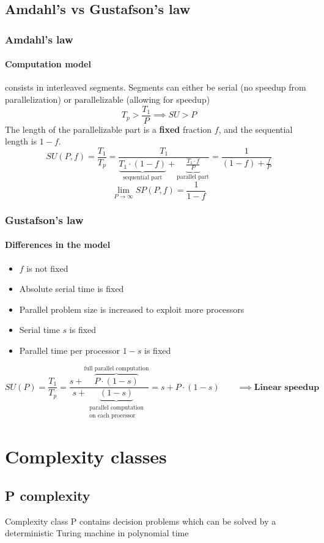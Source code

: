 \documentclass{article}
\begin{document}
\subsection{Amdahl's vs Gustafson's law}
\subsubsection{Amdahl's law}
\paragraph{Computation model} consists in interleaved segments. Segments can either be serial (no speedup from parallelization) or parallelizable (allowing for speedup)\\
\[T_p>\frac{T_1}{P} \implies SU>P\]
The length of the parallelizable part is a \textbf{fixed} fraction $f$, and the sequential length is $1-f$.
\[
SU(P,f)=\frac{T_1}{T_p}
=\frac{T_1}{\underbrace{T_1\cdot (1-f)}_\text{sequential part}+\underbrace{\frac{T_1\cdot f}{P}}_\text{parallel part}}
=\frac{1}{(1-f)+\frac{f}{P}}
\]
\[\lim_{P\to \infty} SP(P,f) = \frac{1}{1-f}
\]

\subsubsection{Gustafson's law}
\paragraph{Differences in the model}
\begin{itemize}
\item $f$ is not fixed
\item Absolute serial time is fixed
\item Parallel problem size is increased to exploit more processors
\item Serial time $s$ is fixed
\item Parallel time per processor $1-s$ is fixed
\end{itemize}
\[SU(P)=\frac{T_1}{T_p}
=\frac{s+\overbrace{P\cdot (1-s)}^\text{full parallel computation}}{s+\underbrace{(1-s)}_{\substack{\text{parallel computation}\\ \text{on each processor}}}}
=s+P\cdot (1-s)
\qquad \implies \textbf{Linear speedup}
\]

\section{Complexity classes}
\subsection{P complexity}
Complexity class P contains decision problems which can be solved by a deterministic Turing machine in polynomial time
\end{document}
